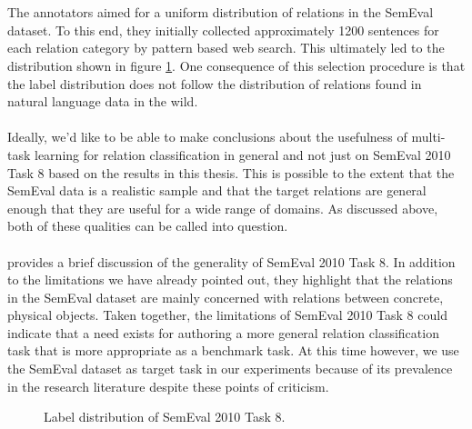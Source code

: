 \\\\
The annotators aimed for a uniform distribution of relations in the SemEval dataset. To this end, they initially collected approximately 1200 sentences for each relation category by pattern based web search. This ultimately led to the distribution shown in figure \ref{semeval_dist}. One consequence of this selection procedure is that the label distribution does not follow the distribution of relations found in natural language data in the wild.
\\\\
Ideally, we'd like to be able to make conclusions about the usefulness of multi-task learning for relation classification in general and not just on SemEval 2010 Task 8 based on the results in this thesis. This is possible to the extent that the SemEval data is a realistic sample and that the target relations are general enough that they are useful for a wide range of domains. As discussed above, both of these qualities can be called into question.
\\\\
\citet{handschuh2016} provides a brief discussion of the generality of SemEval 2010 Task 8. In addition to the limitations we have already pointed out, they highlight that the relations in the SemEval dataset are mainly concerned with relations between concrete, physical objects. Taken together, the limitations of SemEval 2010 Task 8 could indicate that a need exists for authoring a more general relation classification task that is more appropriate as a benchmark task. At this time however, we use the SemEval dataset as target task in our experiments because of its prevalence in the research literature despite these points of criticism.

\begin{figure}
	\center
	
	\caption{Label distribution of SemEval 2010 Task 8.}
	\label{semeval_dist}
\end{figure}

